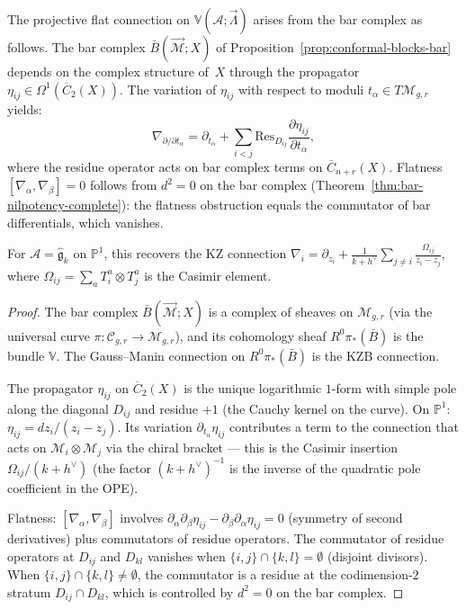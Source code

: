 \begin{proposition}
\label{prop:kzb-bar-complex}
The projective flat connection on
$\mathbb{V}(\mathcal{A}; \vec{\Lambda})$ arises from the
bar complex as follows.  The bar complex
$\bar{B}(\vec{\mathcal{M}}; X)$ of
Proposition~\textup{\ref{prop:conformal-blocks-bar}} depends on the
complex structure of~$X$ through the propagator
$\eta_{ij} \in \Omega^1(\overline{C}_2(X))$.  The variation
of $\eta_{ij}$ with respect to moduli $t_\alpha \in T\mathcal{M}_{g,r}$
yields:
\[
\nabla_{\partial/\partial t_\alpha}
= \partial_{t_\alpha}
+ \sum_{i<j}
\mathrm{Res}_{D_{ij}} \frac{\partial \eta_{ij}}{\partial t_\alpha},
\]
where the residue operator acts on bar complex terms on
$\overline{C}_{n+r}(X)$.  Flatness
$[\nabla_\alpha, \nabla_\beta] = 0$ follows from $d^2 = 0$ on
the bar complex (Theorem~\ref{thm:bar-nilpotency-complete}):
the flatness obstruction equals the commutator of bar
differentials, which vanishes.

For $\mathcal{A} = \widehat{\mathfrak{g}}_k$ on $\mathbb{P}^1$,
this recovers the KZ connection
$\nabla_i = \partial_{z_i} + \frac{1}{k + h^\vee}
\sum_{j \neq i} \frac{\Omega_{ij}}{z_i - z_j}$, where
$\Omega_{ij} = \sum_a T^a_i \otimes T^a_j$ is the Casimir
element.
\end{proposition}

\begin{proof}
The bar complex $\bar{B}(\vec{\mathcal{M}}; X)$ is a complex of
sheaves on $\mathcal{M}_{g,r}$ (via the universal curve
$\pi\colon \mathcal{C}_{g,r} \to \mathcal{M}_{g,r}$), and its
cohomology sheaf $R^0\pi_*(\bar{B})$ is the bundle
$\mathbb{V}$.  The Gauss--Manin connection on
$R^0\pi_*(\bar{B})$ is the KZB connection.

The propagator $\eta_{ij}$ on $\overline{C}_2(X)$ is the unique
logarithmic $1$-form with simple pole along the diagonal $D_{ij}$
and residue $+1$ (the Cauchy kernel on the curve).  On
$\mathbb{P}^1$: $\eta_{ij} = dz_i/(z_i - z_j)$.  Its variation
$\partial_{t_\alpha} \eta_{ij}$ contributes a term to the
connection that acts on $\mathcal{M}_i \otimes \mathcal{M}_j$
via the chiral bracket --- this is the Casimir insertion
$\Omega_{ij}/(k + h^\vee)$ (the factor $(k + h^\vee)^{-1}$
is the inverse of the quadratic pole coefficient in the OPE).

Flatness: $[\nabla_\alpha, \nabla_\beta]$ involves
$\partial_\alpha \partial_\beta \eta_{ij}
- \partial_\beta \partial_\alpha \eta_{ij} = 0$ (symmetry
of second derivatives) plus commutators of residue operators.
The commutator of residue operators at $D_{ij}$ and $D_{kl}$
vanishes when $\{i,j\} \cap \{k,l\} = \emptyset$ (disjoint
divisors).  When $\{i,j\} \cap \{k,l\} \neq \emptyset$, the
commutator is a residue at the codimension-$2$ stratum
$D_{ij} \cap D_{kl}$, which is controlled by $d^2 = 0$ on
the bar complex.
\end{proof}

